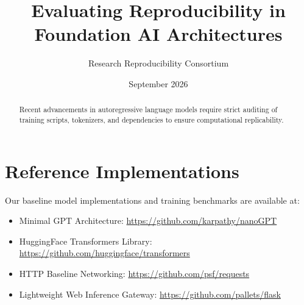 ﻿\documentclass[11pt,a4paper]{article}
\title{Evaluating Reproducibility in Foundation AI Architectures}
\author{Research Reproducibility Consortium}
\date{September 2026}
\begin{document}
\maketitle

\begin{abstract}
Recent advancements in autoregressive language models require strict auditing of training scripts, tokenizers, and dependencies to ensure computational replicability.
\end{abstract}

\section{Reference Implementations}
Our baseline model implementations and training benchmarks are available at:
\begin{itemize}
    \item Minimal GPT Architecture: \url{https://github.com/karpathy/nanoGPT}
    \item HuggingFace Transformers Library: \url{https://github.com/huggingface/transformers}
    \item HTTP Baseline Networking: \url{https://github.com/psf/requests}
    \item Lightweight Web Inference Gateway: \url{https://github.com/pallets/flask}
\end{itemize}
\end{document}
